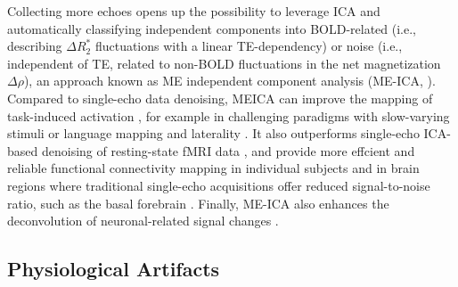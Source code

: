Collecting more echoes opens up the possibility to leverage ICA and
automatically classifying independent components into BOLD-related (i.e.,
describing $\Delta R_2^*$ fluctuations with a linear TE-dependency) or noise
(i.e., independent of TE, related to non-BOLD fluctuations in the net
magnetization $\Delta \rho$), an approach known as ME independent
component analysis (ME-ICA,
\cite{Kundu2013Integratedstrategyimproving,Kundu2012DifferentiatingBOLDnon,Kundu2017MultiechofMRI}).
Compared to single-echo data denoising, MEICA can improve the
mapping of task-induced activation
\citep{DuPre2021TEdependentanalysis,GonzalezCastillo2016Evaluationmultiecho,Lombardo2016Improvingeffectsize},
for example in challenging paradigms with slow-varying stimuli
\citep{Evans2015SeparatingslowBOLD} or language mapping and laterality
\citep{Amemiya2018Integratedmultiecho}. It also outperforms single-echo
ICA-based denoising of resting-state fMRI data
\citep{Dipasquale2017Comparingrestingstate,Lynch2020RapidPrecisionFunctional},
and provide more effcient and reliable functional connectivity mapping in
individual subjects \citep{Lynch2020RapidPrecisionFunctional} and in brain
regions where traditional single-echo acquisitions offer reduced signal-to-noise
ratio, such as the basal forebrain \citep{Markello2018Segregationhumanbasal}.
Finally, ME-ICA also enhances the deconvolution of neuronal-related signal
changes \citep{CaballeroGaudes2019deconvolutionalgorithmmulti}.

\subsection{Physiological Artifacts}

